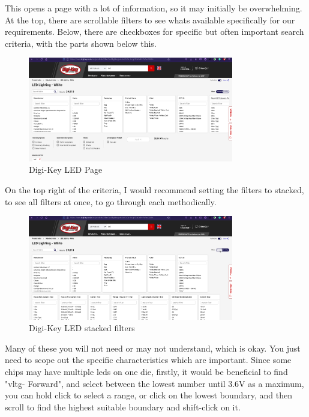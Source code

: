 \documentclass[a4paper,11pt]{report}
\begin{document}
This opens a page with a lot of information, so it may initially be overwhelming. At the top, there are scrollable filters to see whats available specifically for our requirements. Below, there are checkboxes for specific but often important search criteria, with the parts shown below this.

\begin{figure}[H]
\centering
\includegraphics[width=0.8\textwidth]{screenshots/DigiKeyWhiteLEDPage}
\caption{Digi-Key LED Page}
\end{figure}

On the top right of the criteria, I would recommend setting the filters to stacked, to see all filters at once, to go through each methodically.

\begin{figure}[H]
\centering
\includegraphics[width=0.8\textwidth]{screenshots/DigiKeyWhiteLEDPageStacked}
\caption{Digi-Key LED stacked filters}
\end{figure}

Many of these you will not need or may not understand, which is okay. You just need to scope out the specific characteristics which are important. Since some chips may have multiple \gls{led}s on one \gls{die}, firstly, it would be beneficial to find "\gls{vltg}- Forward", and select between the lowest number until 3.6V as a maximum, you can hold click to select a range, or click on the lowest boundary, and then scroll to find the highest suitable boundary and shift-click on it.
\end{document}
